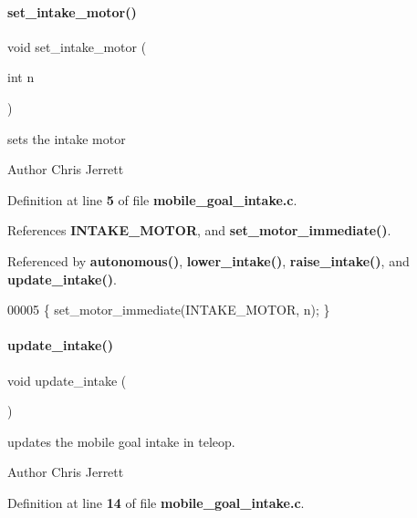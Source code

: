 \paragraph{set\+\_\+intake\+\_\+motor()}
{\footnotesize\ttfamily void set\+\_\+intake\+\_\+motor (\begin{DoxyParamCaption}\item[{int}]{n }\end{DoxyParamCaption})}



sets the intake motor 

\begin{DoxyAuthor}{Author}
Chris Jerrett 
\end{DoxyAuthor}


Definition at line \textbf{ 5} of file \textbf{ mobile\+\_\+goal\+\_\+intake.\+c}.



References \textbf{ I\+N\+T\+A\+K\+E\+\_\+\+M\+O\+T\+OR}, and \textbf{ set\+\_\+motor\+\_\+immediate()}.



Referenced by \textbf{ autonomous()}, \textbf{ lower\+\_\+intake()}, \textbf{ raise\+\_\+intake()}, and \textbf{ update\+\_\+intake()}.


\begin{DoxyCode}
00005 \{ set_motor_immediate(INTAKE_MOTOR, n); \}
\end{DoxyCode}
\mbox{\label{a00047_a5d7bad8a208988af743fd2e68f111286}} 
\paragraph{update\+\_\+intake()}
{\footnotesize\ttfamily void update\+\_\+intake (\begin{DoxyParamCaption}{ }\end{DoxyParamCaption})}



updates the mobile goal intake in teleop. 

\begin{DoxyAuthor}{Author}
Chris Jerrett 
\end{DoxyAuthor}


Definition at line \textbf{ 14} of file \textbf{ mobile\+\_\+goal\+\_\+intake.\+c}.



